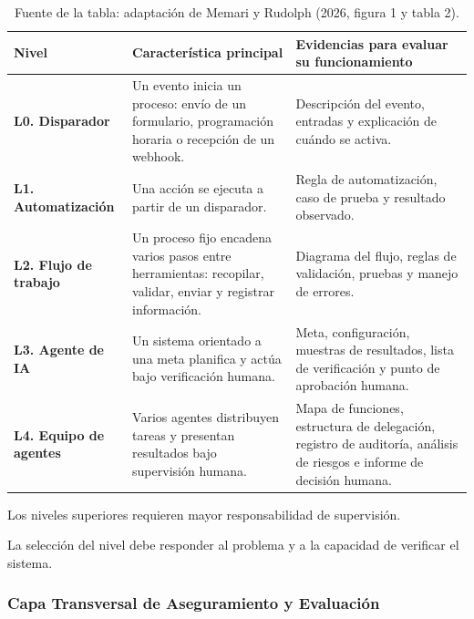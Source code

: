 \begin{table}[htpb!]
    \centering
    \footnotesize
    \renewcommand{\arraystretch}{1.5}
    \begin{tabularx}{\textwidth}{>{\raggedright\arraybackslash\bfseries}p{2.5cm} >{\raggedright\arraybackslash}X >{\raggedright\arraybackslash}X}
    \toprule
    Nivel & \textbf{Característica principal} & \textbf{Evidencias para evaluar su funcionamiento} \\ %
    \midrule
    L0. Disparador & Un evento inicia un proceso: envío de un formulario, programación horaria o recepción de un webhook. & Descripción del evento, entradas y explicación de cuándo se activa. \\ %
    L1. Automatización & Una acción se ejecuta a partir de un disparador. & Regla de automatización, caso de prueba y resultado observado. \\ %
    L2. Flujo de trabajo & Un proceso fijo encadena varios pasos entre herramientas: recopilar, validar, enviar y registrar información. & Diagrama del flujo, reglas de validación, pruebas y manejo de errores. \\ %
    L3. Agente de IA & Un sistema orientado a una meta planifica y actúa bajo verificación humana. & Meta, configuración, muestras de resultados, lista de verificación y punto de aprobación humana. \\ %
    L4. Equipo de agentes & Varios agentes distribuyen tareas y presentan resultados bajo supervisión humana. & Mapa de funciones, estructura de delegación, registro de auditoría, análisis de riesgos e informe de decisión humana. \\ %
    \bottomrule
    \end{tabularx}
    \caption*{Fuente de la tabla: adaptación de Memari y Rudolph (2026, figura 1 y tabla 2).} %
\end{table}

Los niveles superiores requieren mayor responsabilidad de supervisión. %

La selección del nivel debe responder al problema y a la capacidad de verificar el sistema. %

\subsubsection{Capa Transversal de Aseguramiento y Evaluación} %

